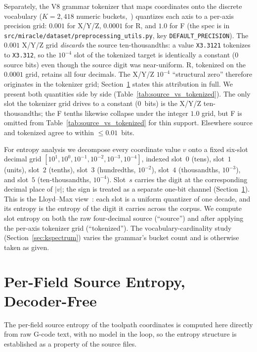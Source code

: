 \documentclass[entropy,article,submit,moreauthors,pdftex]{Definitions/mdpi}
\begin{document}
Separately, the V8 grammar tokenizer that maps coordinates onto the discrete vocabulary ($K=2{,}418$ numeric buckets,~\cite{grammar_paper}) quantizes each axis to a per-axis precision grid: $0.001$ for X/Y/Z, $0.0001$ for R, and $1.0$ for F (the spec is in \texttt{src/miracle/dataset/preprocessing\_utils.py}, key \texttt{DEFAULT\_PRECISION}). The $0.001$ X/Y/Z grid \emph{discards} the source ten-thousandths: a value \texttt{X3.3121} tokenizes to \texttt{X3.312}, so the $10^{-4}$ slot of the tokenized target is identically a constant ($0$ source bits) even though the source digit was near-uniform. R, tokenized on the $0.0001$ grid, retains all four decimals. The X/Y/Z $10^{-4}$ ``structural zero'' therefore originates in the tokenizer grid; Section~\ref{sec:raw-entropy} states this attribution in full. We present both quantities side by side (Table~\ref{tab:source_vs_tokenized}). The only slot the tokenizer grid drives to a constant ($0$~bits) is the X/Y/Z ten-thousandths; the F tenths likewise collapse under the integer $1.0$ grid, but F is omitted from Table~\ref{tab:source_vs_tokenized} for thin support. Elsewhere source and tokenized agree to within $\le\!0.01$~bits.

For entropy analysis we decompose every coordinate value $v$ onto a fixed six-slot decimal grid $[10^{1}, 10^{0}, 10^{-1}, 10^{-2}, 10^{-3}, 10^{-4}]$, indexed slot~$0$ (tens), slot~$1$ (units), slot~$2$ (tenths), slot~$3$ (hundredths, $10^{-2}$), slot~$4$ (thousandths, $10^{-3}$), and slot~$5$ (ten-thousandths, $10^{-4}$). Slot~$s$ carries the digit at the corresponding decimal place of $|v|$; the sign is treated as a separate one-bit channel (Section~\ref{sec:raw-entropy}). This is the Lloyd--Max view~\cite{lloyd1982least}: each slot is a uniform quantizer of one decade, and its entropy is the entropy of the digit it carries across the corpus. We compute slot entropy on both the raw four-decimal source (``source'') and after applying the per-axis tokenizer grid (``tokenized''). The vocabulary-cardinality study (Section~\ref{sec:kspectrum}) varies the grammar's bucket count and is otherwise taken as given.

\section{Per-Field Source Entropy, Decoder-Free}
\label{sec:raw-entropy}

The per-field source entropy of the toolpath coordinates is computed here directly from raw G-code text, with no model in the loop, so the entropy structure is established as a property of the source files.
\end{document}
